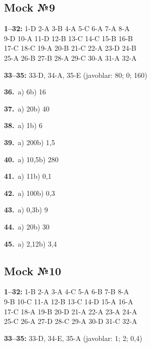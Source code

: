\documentclass[11pt,a4paper]{article}
\begin{document}
\subsection*{Mock №9}
\noindent\textbf{1–32:} 1-D 2-A 3-B 4-A 5-C 6-A 7-A 8-A\\ 9-D 10-A 11-D 12-B 13-C 14-C 15-B 16-B\\ 17-C 18-C 19-A 20-B 21-C 22-A 23-D 24-B\\ 25-A 26-B 27-B 28-A 29-C 30-A 31-A 32-A\par
\noindent\textbf{33–35:} 33-D, 34-A, 35-E \quad (javoblar: 80; 0; 160)\par
\noindent\textbf{36.}\ a) 6\quad b) 16\par
\noindent\textbf{37.}\ a) 20\quad b) 40\par
\noindent\textbf{38.}\ a) 1\quad b) 6\par
\noindent\textbf{39.}\ a) 200\quad b) 1,5\par
\noindent\textbf{40.}\ a) 10,5\quad b) 280\par
\noindent\textbf{41.}\ a) 11\quad b) 0,1\par
\noindent\textbf{42.}\ a) 100\quad b) 0,3\par
\noindent\textbf{43.}\ a) 0,3\quad b) 9\par
\noindent\textbf{44.}\ a) 20\quad b) 30\par
\noindent\textbf{45.}\ a) 2,12\quad b) 3,4\par
{}\par\bigskip
{}\subsection*{Mock №10}
\noindent\textbf{1–32:} 1-B 2-A 3-A 4-C 5-A 6-B 7-B 8-A\\ 9-B 10-C 11-A 12-B 13-C 14-D 15-A 16-A\\ 17-C 18-A 19-B 20-D 21-A 22-A 23-A 24-A\\ 25-C 26-A 27-D 28-C 29-A 30-D 31-C 32-A\par
\noindent\textbf{33–35:} 33-D, 34-E, 35-A \quad (javoblar: 1; 2; 0,4)\par
\end{document}
